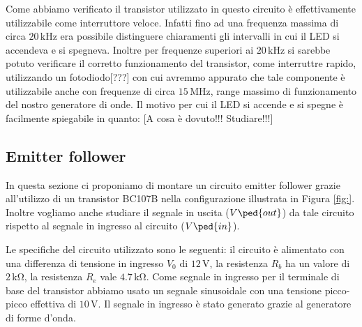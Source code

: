 Come abbiamo verificato il transistor utilizzato in questo circuito è effettivamente utilizzabile come interruttore veloce. Infatti fino ad una frequenza massima di circa $20\,\si{\kilo\hertz}$ era possibile distinguere chiaramenti gli intervalli in cui il LED si accendeva e si spegneva. Inoltre per frequenze superiori ai $20\,\si{\kilo\hertz}$  si sarebbe potuto verificare il corretto funzionamento del transistor, come interruttre rapido, utilizzando un fotodiodo[???] con cui avremmo appurato che tale componente è utilizzabile anche con frequenze di circa $15\,\si{\mega\hertz}$, range massimo di funzionamento del nostro generatore di onde.
Il motivo per cui il LED si accende e si spegne è facilmente spiegabile in quanto: [A cosa è dovuto!!! Studiare!!!]

\subsection{Emitter follower}

In questa sezione ci proponiamo di montare un circuito emitter follower grazie all'utilizzo di un transistor BC107B nella configurazione illustrata in Figura \ref{fig:}. Inoltre vogliamo anche studiare il segnale in uscita ($V\ped{out}$) da tale circuito rispetto al segnale in ingresso al circuito ($V\ped{in}$).

Le specifiche del circuito utilizzato sono le seguenti: il circuito è alimentato con una differenza di tensione in ingresso $V_0$ di $12\,\si{\volt}$, la resistenza $R_b$ ha un valore di $2\,\si{\kilo\ohm}$, la resistenza $R_e$ vale $4.7\,\si{\kilo\ohm}$. Come segnale in ingresso per il terminale di base del transistor abbiamo usato un segnale sinusoidale con una tensione picco-picco effettiva di $10\,\si{\volt}$. Il segnale in ingresso è stato generato grazie al generatore di forme d'onda.



\subsection{}

\subsection{}
